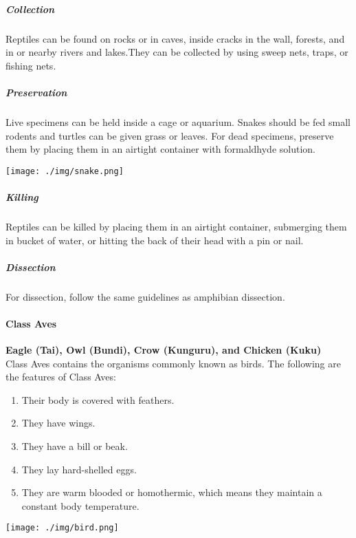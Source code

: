 \begin{multicols}{2}
\subparagraph{Collection}
Reptiles can be found on rocks or in caves, inside cracks in the wall, forests, and in or nearby rivers and lakes.They can be collected by using sweep nets, traps, or fishing nets.

\subparagraph{Preservation} 
Live specimens can be held inside a cage or aquarium. Snakes should be fed small rodents and turtles can be given grass or leaves. For dead specimens, preserve them by placing them in an airtight container with formaldhyde solution.

\begin{center}
\texttt{[image: ./img/snake.png]}
\end{center}

%

\subparagraph{Killing}
Reptiles can be killed by placing them in an airtight container, submerging them in bucket of water, or hitting the back of their head with a pin or nail.

\subparagraph{Dissection}
For dissection, follow the same guidelines as amphibian dissection.

\paragraph{Class Aves}

\textbf{Eagle (Tai), Owl (Bundi), Crow (Kunguru), and Chicken (Kuku)}\\ Class Aves contains the organisms commonly known as birds. The following are the features of Class Aves:\\
\begin{enumerate}
\item{Their body is covered with feathers.}
\item{They have wings.}
\item{They have a bill or beak.}
\item{They lay hard-shelled eggs.}
\item{They are warm blooded or homothermic, which means they maintain a constant body temperature.}
\end{enumerate}

\begin{center}
\texttt{[image: ./img/bird.png]}
\end{center}


\end{multicols}
